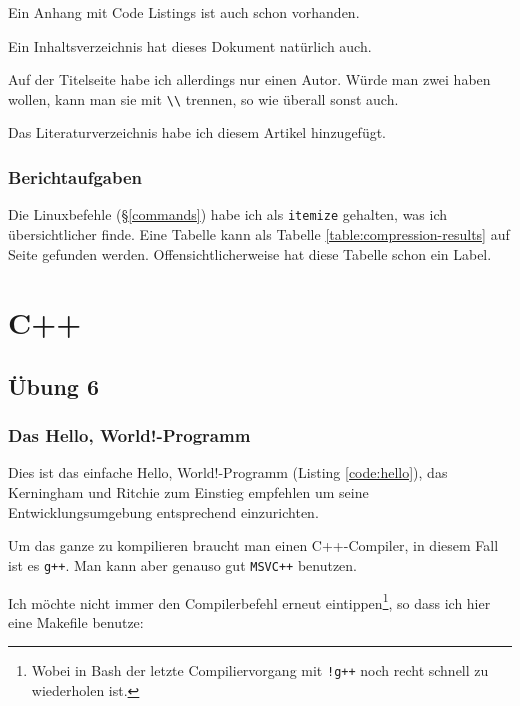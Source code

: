 \documentclass[12pt]{report}
\newcommand\gqq[1]{\glqq #1\grqq}
\begin{document}
Ein Anhang mit Code Listings ist auch schon vorhanden.

Ein Inhaltsverzeichnis hat dieses Dokument natürlich auch.

Auf der Titelseite habe ich allerdings nur einen Autor. Würde man zwei haben wollen, kann man sie mit \verb#\\# trennen, so wie überall sonst auch.

Das Literaturverzeichnis habe ich diesem Artikel hinzugefügt.

\section{Berichtaufgaben}

Die Linuxbefehle (§\ref{commands}) habe ich als \texttt{itemize} gehalten, was ich übersichtlicher finde. Eine Tabelle kann als Tabelle \ref{table:compression-results} auf Seite \pageref{table:compression-results} gefunden werden. Offensichtlicherweise hat diese Tabelle schon ein Label.


\part{C++}

\chapter{Übung 6}

\section{Das \gqq{Hello, World!}-Programm}

Dies ist das einfache \gqq{Hello, World!}-Programm (Listing \ref{code:hello}), das Kerningham und Ritchie zum Einstieg empfehlen um seine Entwicklungsumgebung entsprechend einzurichten.



Um das ganze zu kompilieren braucht man einen C++-Compiler, in diesem Fall ist es \texttt{g++}. Man kann aber genauso gut \texttt{MSVC++} benutzen.

Ich möchte nicht immer den Compilerbefehl erneut eintippen\footnote{Wobei in Bash der letzte Compiliervorgang mit \texttt{!g++} noch recht schnell zu wiederholen ist.}, so dass ich hier eine Makefile benutze:


\end{document}
